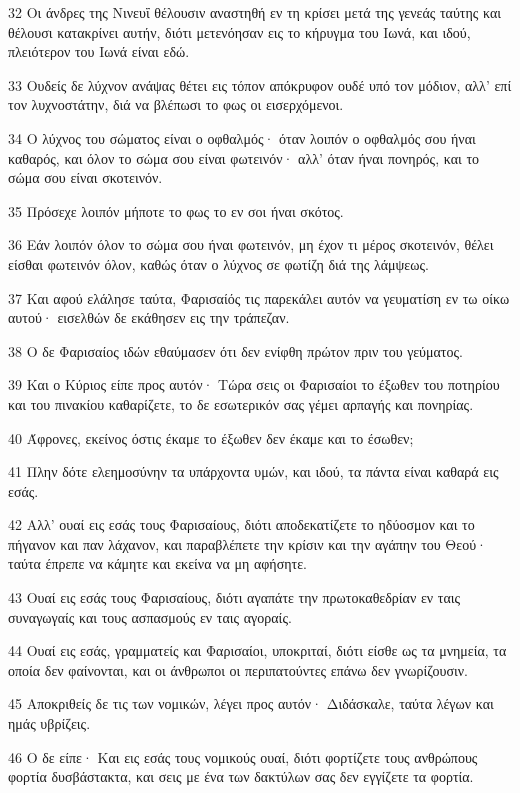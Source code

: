 \par 32 Οι άνδρες της Νινευΐ θέλουσιν αναστηθή εν τη κρίσει μετά της γενεάς ταύτης και θέλουσι κατακρίνει αυτήν, διότι μετενόησαν εις το κήρυγμα του Ιωνά, και ιδού, πλειότερον του Ιωνά είναι εδώ.
\par 33 Ουδείς δε λύχνον ανάψας θέτει εις τόπον απόκρυφον ουδέ υπό τον μόδιον, αλλ' επί τον λυχνοστάτην, διά να βλέπωσι το φως οι εισερχόμενοι.
\par 34 Ο λύχνος του σώματος είναι ο οφθαλμός· όταν λοιπόν ο οφθαλμός σου ήναι καθαρός, και όλον το σώμα σου είναι φωτεινόν· αλλ' όταν ήναι πονηρός, και το σώμα σου είναι σκοτεινόν.
\par 35 Πρόσεχε λοιπόν μήποτε το φως το εν σοι ήναι σκότος.
\par 36 Εάν λοιπόν όλον το σώμα σου ήναι φωτεινόν, μη έχον τι μέρος σκοτεινόν, θέλει είσθαι φωτεινόν όλον, καθώς όταν ο λύχνος σε φωτίζη διά της λάμψεως.
\par 37 Και αφού ελάλησε ταύτα, Φαρισαίός τις παρεκάλει αυτόν να γευματίση εν τω οίκω αυτού· εισελθών δε εκάθησεν εις την τράπεζαν.
\par 38 Ο δε Φαρισαίος ιδών εθαύμασεν ότι δεν ενίφθη πρώτον πριν του γεύματος.
\par 39 Και ο Κύριος είπε προς αυτόν· Τώρα σεις οι Φαρισαίοι το έξωθεν του ποτηρίου και του πινακίου καθαρίζετε, το δε εσωτερικόν σας γέμει αρπαγής και πονηρίας.
\par 40 Άφρονες, εκείνος όστις έκαμε το έξωθεν δεν έκαμε και το έσωθεν;
\par 41 Πλην δότε ελεημοσύνην τα υπάρχοντα υμών, και ιδού, τα πάντα είναι καθαρά εις εσάς.
\par 42 Αλλ' ουαί εις εσάς τους Φαρισαίους, διότι αποδεκατίζετε το ηδύοσμον και το πήγανον και παν λάχανον, και παραβλέπετε την κρίσιν και την αγάπην του Θεού· ταύτα έπρεπε να κάμητε και εκείνα να μη αφήσητε.
\par 43 Ουαί εις εσάς τους Φαρισαίους, διότι αγαπάτε την πρωτοκαθεδρίαν εν ταις συναγωγαίς και τους ασπασμούς εν ταις αγοραίς.
\par 44 Ουαί εις εσάς, γραμματείς και Φαρισαίοι, υποκριταί, διότι είσθε ως τα μνημεία, τα οποία δεν φαίνονται, και οι άνθρωποι οι περιπατούντες επάνω δεν γνωρίζουσιν.
\par 45 Αποκριθείς δε τις των νομικών, λέγει προς αυτόν· Διδάσκαλε, ταύτα λέγων και ημάς υβρίζεις.
\par 46 Ο δε είπε· Και εις εσάς τους νομικούς ουαί, διότι φορτίζετε τους ανθρώπους φορτία δυσβάστακτα, και σεις με ένα των δακτύλων σας δεν εγγίζετε τα φορτία.
